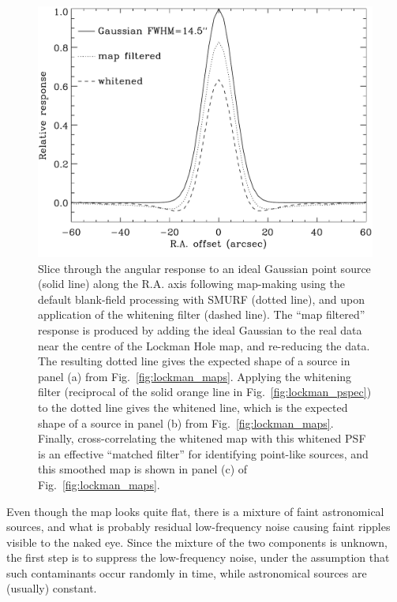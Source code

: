\documentclass[useAMS,usenatbib,nofootinbib]{mn2e}
\begin{document}
\begin{figure}
\centering
\includegraphics[width=\linewidth]{lockman_psf.pdf}
\caption{Slice through the angular response to an ideal Gaussian point
  source (solid line) along the R.A. axis following map-making using
  the default blank-field processing with SMURF (dotted line), and
  upon application of the whitening filter (dashed line). The ``map
  filtered'' response is produced by adding the ideal Gaussian to the
  real data near the centre of the Lockman Hole map, and re-reducing
  the data. The resulting dotted line gives the expected shape of a
  source in panel (a) from Fig.~\ref{fig:lockman_maps}. Applying the
  whitening filter (reciprocal of the solid orange line in
  Fig.~\ref{fig:lockman_pspec}) to the dotted line gives the whitened
  line, which is the expected shape of a source in panel (b) from
  Fig.~\ref{fig:lockman_maps}. Finally, cross-correlating the whitened
  map with this whitened PSF is an effective ``matched filter'' for
  identifying point-like sources, and this smoothed map is shown in
  panel (c) of Fig.~\ref{fig:lockman_maps}.}
\label{fig:lockman_psf}
\end{figure}


Even though the map looks quite flat, there is a mixture of faint
astronomical sources, and what is probably residual low-frequency
noise causing faint ripples visible to the naked eye. Since the
mixture of the two components is unknown, the first step is to
suppress the low-frequency noise, under the assumption that such
contaminants occur randomly in time, while astronomical sources are
(usually) constant.
\end{document}

